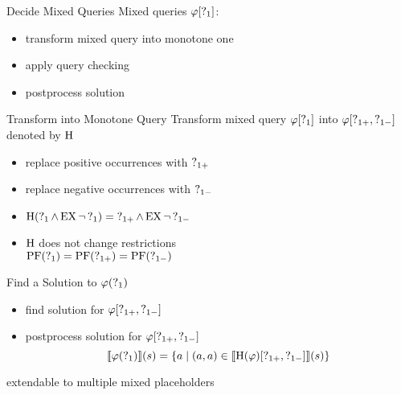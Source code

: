 \begin{frame}{Decide Mixed Queries}
  Mixed queries $\varphi[\operatorname{?}_1]$:
  \begin{itemize}
    \item transform mixed query into monotone one
    \item apply query checking
    \item postprocess solution
  \end{itemize}
\end{frame}

\begin{frame}{Transform into Monotone Query}
  Transform mixed query $\varphi[\operatorname{?}_1]$ into $\varphi[\operatorname{?}_{1+},\operatorname{?}_{1-}]$ denoted by $\operatorname{H}$
  \begin{itemize}
    \item replace positive occurrences with $\operatorname{?}_{1+}$
    \item replace negative occurrences with $\operatorname{?}_{1-}$
    \item $\operatorname{H}(\operatorname{?}_1 \land \operatorname{EX} \lnot \operatorname{?}_1) = \operatorname{?}_{1+} \land \operatorname{EX} \lnot \operatorname{?}_{1-}$
    \item $\operatorname{H}$ does not change restrictions \\ 
          $\operatorname{PF}(\operatorname{?}_{1}) = \operatorname{PF}(\operatorname{?}_{1+}) = \operatorname{PF}(\operatorname{?}_{1-})$
  \end{itemize}
\end{frame}

\begin{frame}{Find a Solution to $\varphi(\operatorname{?}_1)$}
  \begin{itemize}
    \item find solution for $\varphi[\operatorname{?}_{1+},\operatorname{?}_{1-}]$
    \item postprocess solution for $\varphi[\operatorname{?}_{1+},\operatorname{?}_{1-}]$
      \[
        \llbracket \varphi(\operatorname{?}_1) \rrbracket (s) = \{ a \mid (a,a) \in 
          \llbracket \operatorname{H} (\varphi)[\operatorname{?}_{1+},\operatorname{?}_{1-}] \rrbracket (s) \}
      \]
  \end{itemize}
  
  extendable to multiple mixed placeholders
\end{frame}
